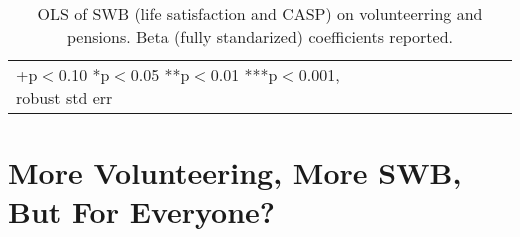 \documentclass[10pt, letterpaper]{article}
\begin{document}
\begin{spacing}{1.4}



\begin{spacing}{.9}
\begin{table}[H]\centering \caption{OLS of SWB  (life satisfaction and CASP) on
    volunteerring and pensions. Beta (fully standarized) coefficients reported.}  \begin{scriptsize} \begin{tabular}{p{1.8in}p{.5in}p{.5in}p{.5in}p{.5in}|p{.5in}p{.5in}p{.5in}p{.5in}p{.5in}p{.4in}p{.5in}p{.4in}}\hline 
      \hline\multicolumn{5}{l}{+p$<$0.10 *p$<$0.05 **p$<$0.01 ***p$<$0.001,
        robust std err} \end{tabular}\label{regCw6w4} \end{scriptsize}\end{table}
\end{spacing}




\section*{More Volunteering, More SWB, But For Everyone?}


\end{spacing}
\end{document}
